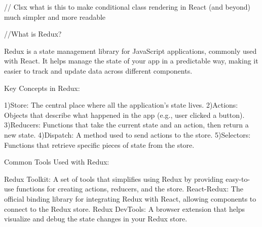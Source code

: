 // Clsx   what is this 
to make conditional class rendering in React (and beyond) much simpler and more readable

//What is Redux?

Redux is a state management library for JavaScript applications, commonly used with React. It helps manage the state of your app in a predictable way,
making it easier to track and update data across different components.

Key Concepts in Redux:

1)Store: The central place where all the application's state lives.
2)Actions: Objects that describe what happened in the app (e.g., user clicked a button).
3)Reducers: Functions that take the current state and an action, then return a new state.
4)Dispatch: A method used to send actions to the store.
5)Selectors: Functions that retrieve specific pieces of state from the store.

Common Tools Used with Redux:

Redux Toolkit: A set of tools that simplifies using Redux by providing easy-to-use functions for creating actions, reducers, and the store.
React-Redux: The official binding library for integrating Redux with React, allowing components to connect to the Redux store.
Redux DevTools: A browser extension that helps visualize and debug the state changes in your Redux store.

